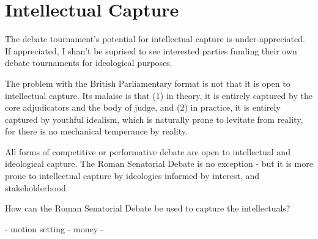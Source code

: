 \section{Intellectual Capture}

The debate tournament's potential for intellectual capture is under-appreciated. If appreciated, I shan't be suprised to see interested parties funding their own debate tournaments for ideological purposes.

The problem with the British Parliamentary format is not that it is open to intellectual capture. Its malaise is that (1) in theory, it is entirely captured by the core adjudicators and the body of judge, and (2) in practice, it is entirely captured by youthful idealism, which is naturally prone to levitate from reality, for there is no mechanical temperance by reality. 

All forms of competitive or performative debate are open to intellectual and ideological capture. The Roman Senatorial Debate is no exception - but it is more prone to intellectual capture by ideologies informed by interest, and stakeholderhood. 


How can the Roman Senatorial Debate be used to capture the intellectuals?

- motion setting 
- money 
- 